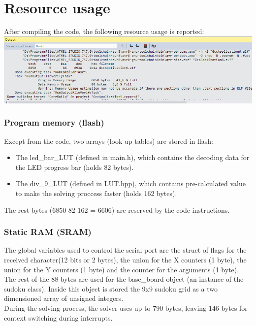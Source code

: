 \documentclass[12pt, a4, hidelinks]{article}
\begin{document}
\section*{Resource usage}
After compiling the code, the following resource usage is reported: \\
\includegraphics[width = \textwidth]{RESOURCES.png} 

\subsubsection*{Program memory (flash)}
Except from the code, two arrays (look up tables) are stored in flash: 
\begin{itemize}
\item The led\_bar\_LUT (defined in main.h), which contains the decoding data for the LED progress bar (holds 82 bytes).
\item The div\_9\_LUT (defined in LUT.hpp), which contains pre-calculated value to make the solving proccess faster (holds 162 bytes).
\end{itemize}
The rest bytes (6850-82-162 = 6606) are reserved by the code instructions.

\subsubsection*{Static RAM (SRAM)}
The global variables used to control the serial port are the struct of flags for the received character(12 bits or 2 bytes), the union for the X counters (1 byte), the union for the Y counters (1 byte) and the counter for the arguments (1 byte). The rest of the 88 bytes are used for the base\_board object (an instance of the sudoku class). Inside this object is stored the 9x9 sudoku grid as a two dimensioned array of unsigned integers. \\
During the solving process, the solver uses up to 790 bytes, leaving 146 bytes for context switching during interrupts.
\end{document}
